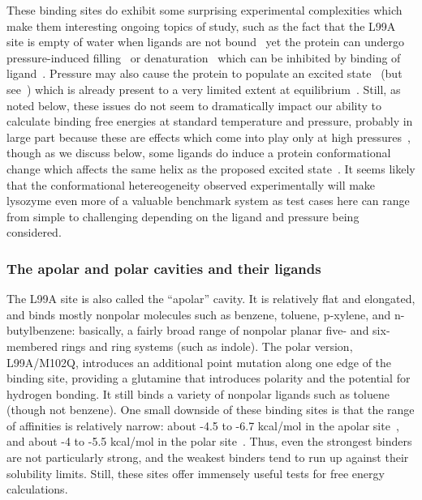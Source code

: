 \documentclass[aps,pre,twocolumn,nofootinbib,superscriptaddress,10pt, final,tightenlines]{revtex4-1}
\begin{document}
These binding sites do exhibit some surprising experimental complexities which make them interesting ongoing topics of study, such as the fact that the L99A site is empty of water when ligands are not bound~\cite{Nucci:2014:PNAS, Lerch:2015:PNAS, Collins:2007:JournalofMolecularBiology} yet the protein can undergo pressure-induced filling~\cite{Collins:2007:JournalofMolecularBiology,Lerch:2015:PNAS} or denaturation~\cite{Nucci:2014:PNAS} which can be inhibited by binding of ligand~\cite{Nucci:2014:PNAS, Lerch:2015:PNAS}. 
Pressure may also cause the protein to populate an excited state~\cite{Maeno:2015:BiophysicalJournal, Kitahara:2015:PNAS} (but see~\cite{Wand:2015:PNAS}) which is already present to a very limited extent at equilibrium~\cite{Bouvignies:2011:Nature}.
Still, as noted below, these issues do not seem to dramatically impact our ability to calculate binding free energies at standard temperature and pressure, probably in large part because these are effects which come into play only at high pressures~\cite{Nucci:2014:PNAS, Lerch:2015:PNAS, Maeno:2015:BiophysicalJournal}, though as we discuss below, some ligands do induce a protein conformational change which affects the same helix as the proposed excited state~\cite{merski_homologous_2015}.
It seems likely that the conformational hetereogeneity observed experimentally will make lysozyme even more of a valuable benchmark system as test cases here can range from simple to challenging depending on the ligand and pressure being considered.


\subsubsection{The apolar and polar cavities and their ligands}
The L99A site is also called the ``apolar'' cavity. It is relatively flat and elongated, and binds mostly nonpolar molecules such as benzene, toluene, p-xylene, and n-butylbenzene: basically, a fairly broad range of nonpolar planar five- and six-membered rings and ring systems (such as indole).
The polar version, L99A/M102Q, introduces an additional point mutation along one edge of the binding site, providing a glutamine that introduces polarity and the potential for hydrogen bonding. 
It still binds a variety of nonpolar ligands such as toluene (though not benzene). 
One small downside of these binding sites is that the range of affinities is relatively narrow: about -4.5 to -6.7 kcal/mol in the apolar site~\cite{morton_energetic_1995, mobley_predicting_2007}, and about -4 to -5.5 kcal/mol in the polar site~\cite{boyce_predicting_2009}. Thus, even the strongest binders are not particularly strong, and the weakest binders tend to run up against their solubility limits. 
Still, these sites offer immensely useful tests for free energy calculations.
\end{document}
